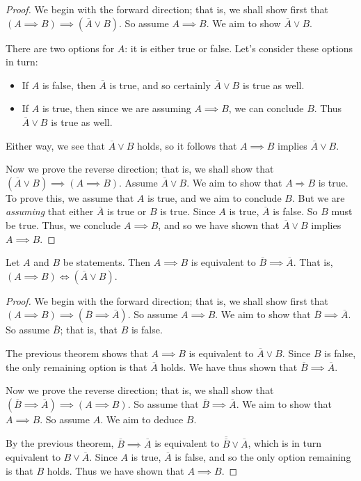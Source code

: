 \documentclass[11pt,dvipsnames]{book}
\numberwithin{figure}{section} %
\numberwithin{table}{section} %
\begin{document}
\begin{proof}
We begin with the forward direction;
that is, we shall show first that $(A \implies B) \implies (\overline{A} \vee B)$.
So assume $A\implies B$.
We aim to show $\overline{A} \vee B$.

There are two options for $A$: it is either true or false.
Let's consider these options in turn:
\begin{itemize}
\item If $A$ is false, then $\overline{A}$ is true, and so certainly $\overline{A} \vee B$ is true as well.
\item If $A$ is true, then since we are assuming $A\implies B$, we can conclude $B$.
Thus $\overline{A} \vee B$ is true as well.
\end{itemize}
Either way, we see that $\overline{A} \vee B$ holds, so it follows that $A\implies B$ implies $\overline{A} \vee B$. 

Now we prove the reverse direction;
that is, we shall show that $(\overline{A} \vee B) \implies (A \implies B)$.
Assume $\overline{A} \vee B$.
We aim to show that $A\Rightarrow B$ is true.
To prove this, we assume that $A$ is true, and we aim to conclude $B$.
But we are \emph{assuming} that either $\overline{A}$ is true or $B$ is true.
Since $A$ is true, $\overline{A}$ is false.
So $B$ must be true.
Thus, we conclude $A\implies B$, and so we have shown that $\overline{A} \vee B$ implies $A \implies B$.
\end{proof}

\begin{theorem}
Let $A$ and $B$ be statements.
Then $A \implies B$ is equivalent to $\overline{B} \implies \overline{A}$.
That is, $(A \implies B) \iff (\overline{A} \vee B)$.
\end{theorem}

\begin{proof}
We begin with the forward direction;
that is, we shall show first that $(A \implies B) \implies (\overline{B} \implies \overline{A})$.
So assume $A\implies B$.
We aim to show that $\overline{B} \implies \overline{A}$.
So assume $\overline{B}$; that is, that $B$ is false.

The previous theorem shows that $A \implies B$ is equivalent to $\overline{A} \vee B$.
Since $B$ is false, the only remaining option is that $\overline{A}$ holds.
We have thus shown that $\overline{B} \implies \overline{A}$.

Now we prove the reverse direction;
that is, we shall show that $(\overline{B} \implies \overline{A}) \implies (A \implies B)$.
So assume that $\overline{B} \implies \overline{A}$.
We aim to show that $A \implies B$.
So assume $A$.
We aim to deduce $B$.

By the previous theorem, $\overline{B} \implies \overline{A}$ is equivalent to $\overline{\overline{B}} \vee \overline{A}$, which is in turn equivalent to $B \vee \overline{A}$.
Since $A$ is true, $\overline{A}$ is false, and so the only option remaining is that $B$ holds.
Thus we have shown that $A \implies B$.
\end{proof}
\end{document}
